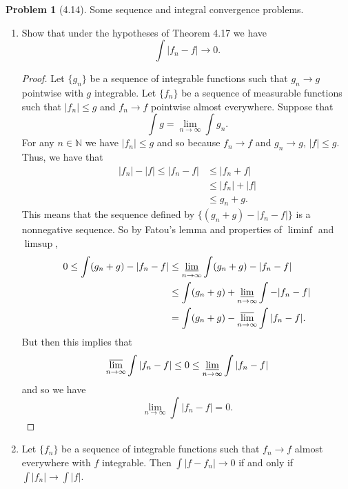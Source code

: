 \documentclass[12pt]{article}
\newcommand{\N}{\mathbb{N}}
\theoremstyle{definition}
\newtheorem{problem}{Problem}
\begin{document}
\begin{problem}[4.14] 
    Some sequence and integral convergence problems.
    \begin{enumerate}[label = (\alph{*})]
        \item Show that under the hypotheses of Theorem 4.17 we have
            \[
                \int \left| f_n - f \right| \to 0.  
            \]

            \begin{proof}
                Let \( \{g_n\} \) be a sequence of integrable functions such that \( g_n \to g \) pointwise with \( g \) integrable. 
                Let \( \{f_n\} \) be a sequence of measurable functions such that \( |f_n| \leq g \) and \( f_n \to f \) pointwise almost everywhere. Suppose that 
                    \[
                        \int g = \lim_{n \to \infty} \int g_n.  
                    \]
                For any \( n \in \N \) we have \( |f_n| \leq g \) and so because \( f_n \to f \) and \( g_n \to g \), \( |f| \leq g\).
                Thus, we have that
                    \begin{align*}
                        |f_n| - |f| \leq |f_n - f| &\leq |f_n + f| \\
                        &\leq |f_n| + |f|  \\
                        &\leq g_n + g.
                    \end{align*}
                This means that the sequence defined by \( \{ (g_n + g) - |f_n - f| \}\) is a nonnegative sequence. So by Fatou's lemma and properties of \( \liminf \) and \( \limsup \),
                    \begin{align*}
                        0 \leq \int (g_n + g) - |f_n - f| &\leq \varliminf_{n \to \infty} \int (g_n + g) - |f_n - f| \\
                        &\leq \int (g_n + g) + \varliminf_{n \to \infty} \int - |f_n - f| \\
                        &= \int (g_n + g) - \varlimsup_{n \to \infty} \int |f_n - f|.
                    \end{align*}
                But then this implies that 
                    \[
                        \varlimsup_{n \to \infty} \int |f_n - f| \leq 0 \leq \varliminf_{n \to \infty} \int |f_n - f|
                    \]
                and so we have 
                    \[
                        \lim_{n \to \infty } \int |f_n -f| = 0.  
                    \]
            \end{proof}
        \item Let \( \{f_n\} \) be a sequence of integrable functions such that \( f_n \to f \) almost everywhere with \( f \) integrable. Then \( \displaystyle \int |f - f_n| \to 0 \) if and only if \( \displaystyle \int |f_n| \to \int |f| \).

\end{enumerate}
\end{problem}
\end{document}
